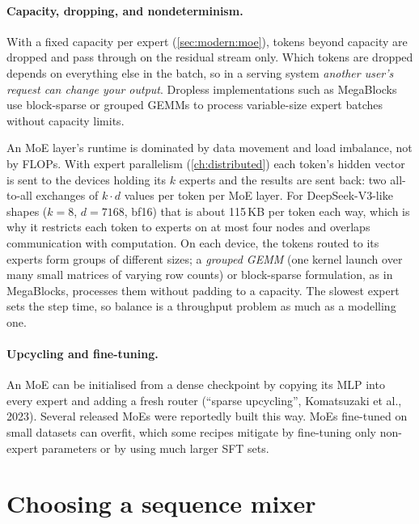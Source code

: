 \paragraph{Capacity, dropping, and nondeterminism.} With a fixed capacity per expert
(\cref{sec:modern:moe}), tokens beyond capacity are dropped and pass through on the residual stream
only. Which tokens are dropped depends on everything else in the batch, so in a serving system \emph{another
user's request can change your output}. Dropless implementations such as MegaBlocks use block-sparse or
grouped GEMMs to process variable-size expert batches without capacity limits.

\begin{systemslens}
An MoE layer's runtime is dominated by data movement and load imbalance, not by FLOPs. With expert
parallelism (\cref{ch:distributed}) each token's hidden vector is sent to the devices holding its $k$ experts
and the results are sent back: two all-to-all exchanges of $k\cdot d$ values per token per MoE layer. For
DeepSeek-V3-like shapes ($k=8$, $d=7168$, bf16) that is about 115\,KB per token each way, which is why it
restricts each token to experts on at most four nodes and overlaps communication with computation. On each
device, the tokens routed to its experts form groups of different sizes; a \emph{grouped GEMM} (one kernel
launch over many small matrices of varying row counts) or block-sparse formulation, as in MegaBlocks,
processes them without padding to a capacity. The slowest expert sets the step time, so balance is a
throughput problem as much as a modelling one.
\end{systemslens}

\paragraph{Upcycling and fine-tuning.} An MoE can be initialised from a dense checkpoint by copying its MLP
into every expert and adding a fresh router (``sparse upcycling'', Komatsuzaki et al., 2023). Several
released MoEs were reportedly built this way. MoEs fine-tuned on small datasets can overfit, which some
recipes mitigate by fine-tuning only non-expert parameters or by using much larger SFT sets.

\section{Choosing a sequence mixer}\label{sec:attnalt:choose}

